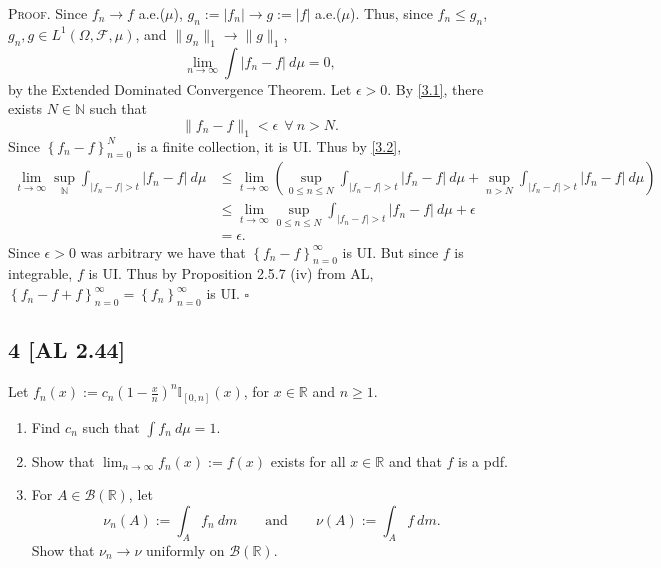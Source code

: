 \documentclass[12pt]{article}
\newcounter{ProofCounter}
\newenvironment{Proof}{\stepcounter{ProofCounter}\textsc{Proof.}}{\hfill$\square$}
\begin{document}
\begin{Proof}
Since $f_{n} \rightarrow f$ a.e.($\mu$), $g_{n} := |f_{n}| \rightarrow g := |f|$ a.e.($\mu$). Thus, since $f_{n} \leq g_n$, $g_{n}, g \in
L^{1}(\Omega, \mathcal{F}, \mu)$, and $\|g_{n}\|_{1} \rightarrow \|g\|_{1}$,
\begin{equation}
\lim_{n\rightarrow\infty}\int |f_{n} - f|\ d\mu = 0,
\label{3.1}
\end{equation}
by the Extended Dominated Convergence Theorem. Let $\epsilon > 0$. By \eqref{3.1}, there exists $N \in \mathbb{N}$ such that 
\begin{equation}
\|f_{n} - f\|_{1} < \epsilon \ \ \forall \ n > N. 
\label{3.2}
\end{equation}
Since $\left\{ f_{n} - f \right\}_{n=0}^{N}$ is a finite collection, it is UI. Thus by \eqref{3.2},
\begin{align*}
\lim_{t\rightarrow\infty}\sup_{\mathbb{N}}\int_{|f_{n}-f|>t}|f_{n} - f|\ d\mu & \leq \lim_{t\rightarrow\infty}\left( 
\sup_{0\leq n\leq N}\int_{|f_{n}-f|>t}|f_{n} - f|\ d\mu + \sup_{n>N}\int_{|f_{n}-f|>t}|f_{n}-f|\ d\mu \right) \\
& \leq \lim_{t\rightarrow\infty}\sup_{0\leq n \leq N}\int_{|f_{n} -f|>t}|f_{n} - f|\ d\mu + \epsilon \\
& = \epsilon.
\end{align*}
Since $\epsilon > 0$ was arbitrary we have that $\left\{ f_{n} - f \right\}_{n=0}^{\infty}$ is UI. But since $f$ is integrable, $f$ is UI. Thus by
Proposition 2.5.7 (iv) from AL, $\left\{ f_{n} - f + f \right\}_{n=0}^{\infty} = \left\{ f_{n} \right\}_{n=0}^{\infty}$ is UI.
\end{Proof}






\newpage
\subsection*{4 [AL 2.44]}
\begin{tcolorbox}
Let $f_{n}(x) := c_{n}\left( 1 - \frac{x}{n} \right)^{n}\mathbb{I}_{[0,n]}(x)$, for $x \in \mathbb{R}$ and $n\geq 1$.
\begin{enumerate}[label=(\alph*)]
\item Find $c_{n}$ such that $\int f_{n}\ d\mu = 1$.
\item Show that $\lim_{n\rightarrow\infty}f_{n}(x) := f(x)$ exists for all $x \in \mathbb{R}$ and that $f$ is a pdf.
\item For $A \in \mathcal{B}(\mathbb{R})$, let 
\[ \nu_{n}(A) := \int_{A}f_{n}\ dm \qquad \text{and} \qquad \nu(A) := \int_{A}f\ dm. \]
Show that $\nu_{n} \rightarrow \nu$ uniformly on $\mathcal{B}(\mathbb{R})$.
\end{enumerate}
\end{tcolorbox}
\end{document}

